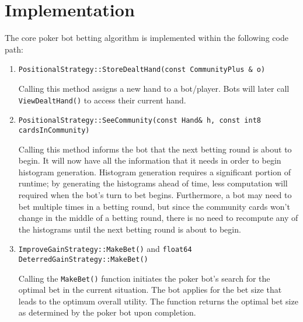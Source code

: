 \section{Implementation}
\label{sec:CompleteImplementation}


The core poker bot betting algorithm is implemented within the following code path:
\begin{enumerate}
\singlespacing
\item \texttt{PositionalStrategy::StoreDealtHand(const CommunityPlus \& o)}

Calling this method assigns a new hand to a bot/player.
Bots will later call \texttt{ViewDealtHand()} to access their current hand.

\item \texttt{PositionalStrategy::SeeCommunity(const Hand\& h, const int8 cardsInCommunity)}

Calling this method informs the bot that the next betting round is about to begin.
It will now have all the information that it needs in order to begin histogram generation.
Histogram generation requires a significant portion of runtime; by generating the histograms ahead of time, less computation will required when the bot's turn to bet begins.
Furthermore, a bot may need to bet multiple times in a betting round, but since the community cards won't change in the middle of a betting round, there is no need to recompute any of the histograms until the next betting round is about to begin.

\item \texttt{ImproveGainStrategy::MakeBet()} and \texttt{float64 DeterredGainStrategy::MakeBet()}

Calling the \texttt{MakeBet()} function initiates the poker bot's search for the optimal bet in the current situation.
The bot applies for the bet size that leads to the optimum overall utility.
The function returns the optimal bet size as determined by the poker bot upon completion.
\end{enumerate}


\clearpage
